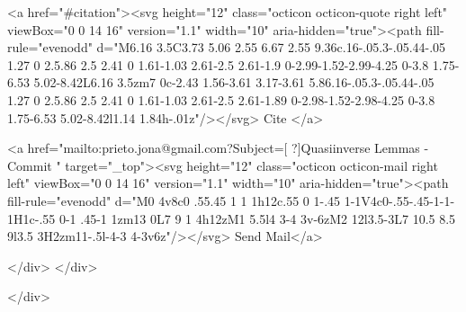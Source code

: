       <a  href="#citation"><svg height="12" class="octicon octicon-quote right left" viewBox="0 0 14 16" version="1.1" width="10" aria-hidden="true"><path fill-rule="evenodd" d="M6.16 3.5C3.73 5.06 2.55 6.67 2.55 9.36c.16-.05.3-.05.44-.05 1.27 0 2.5.86 2.5 2.41 0 1.61-1.03 2.61-2.5 2.61-1.9 0-2.99-1.52-2.99-4.25 0-3.8 1.75-6.53 5.02-8.42L6.16 3.5zm7 0c-2.43 1.56-3.61 3.17-3.61 5.86.16-.05.3-.05.44-.05 1.27 0 2.5.86 2.5 2.41 0 1.61-1.03 2.61-2.5 2.61-1.89 0-2.98-1.52-2.98-4.25 0-3.8 1.75-6.53 5.02-8.42l1.14 1.84h-.01z"/></svg> Cite
      </a>

      <a href="mailto:prieto.jona@gmail.com?Subject=[ ?]Quasiinverse Lemmas - Commit " target="_top"><svg height="12" class="octicon octicon-mail right left" viewBox="0 0 14 16" version="1.1" width="10" aria-hidden="true"><path fill-rule="evenodd" d="M0 4v8c0 .55.45 1 1 1h12c.55 0 1-.45 1-1V4c0-.55-.45-1-1-1H1c-.55 0-1 .45-1 1zm13 0L7 9 1 4h12zM1 5.5l4 3-4 3v-6zM2 12l3.5-3L7 10.5 8.5 9l3.5 3H2zm11-.5l-4-3 4-3v6z"/></svg> Send Mail</a>

    </div>
  </div>

</div>




